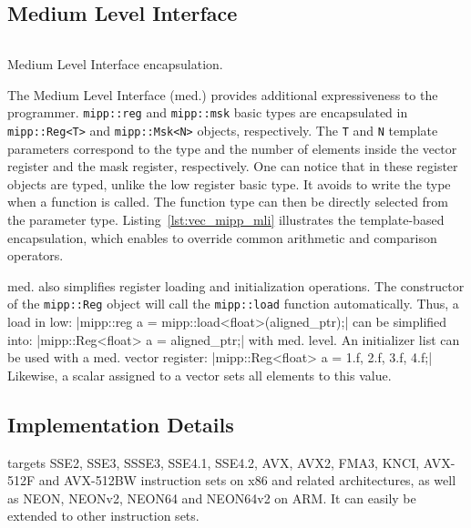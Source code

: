 \subsection{Medium Level Interface}

\begin{listing}[htp]
  \inputminted[frame=lines,linenos]{C++}{main/chapter3/src/mipp/mli.cpp}
  \caption{Medium Level Interface encapsulation.}
  \label{lst:vec_mipp_mli}
\end{listing}

The \MIPP Medium Level Interface (\MIPP med.) provides additional expressiveness
to the programmer. \verb|mipp::reg| and \verb|mipp::msk| basic types are
encapsulated in \verb|mipp::Reg<T>| and \verb|mipp::Msk<N>| objects,
respectively. The \verb|T| and \verb|N| template parameters correspond to the
type and the number of elements inside the vector register and the mask
register, respectively. One can notice that in these register objects are typed,
unlike the \MIPP low register basic type. It avoids to write the type when a
\MIPP function is called. The function type can then be directly selected from
the parameter type. Listing~\ref{lst:vec_mipp_mli} illustrates the
template-based encapsulation, which enables \MIPP to override common arithmetic
and comparison operators.

\MIPP med. also simplifies register loading and initialization operations. The
constructor of the \verb|mipp::Reg| object will call the \verb|mipp::load|
function automatically. Thus, a load in \MIPP low:
|mipp::reg a = mipp::load<float>(aligned_ptr);|
{\noindent
can be simplified into:
}
|mipp::Reg<float> a = aligned_ptr;|
{\noindent
with \MIPP med. level. An initializer list
can be used with a \MIPP med. vector register:
}
|mipp::Reg<float> a = {1.f, 2.f, 3.f, 4.f};|
{\noindent
Likewise, a scalar assigned to a vector sets all elements to
this value.
}

\subsection{Implementation Details}
\label{sec:vec_mipp_implem}

\MIPP targets SSE2, SSE3, SSSE3, SSE4.1, SSE4.2, AVX, AVX2, FMA3, KNCI, AVX-512F
and AVX-512BW instruction sets on x86 and related architectures, as well as
NEON, NEONv2, NEON64 and NEON64v2 on ARM\R. It can easily be extended to other
instruction sets.

